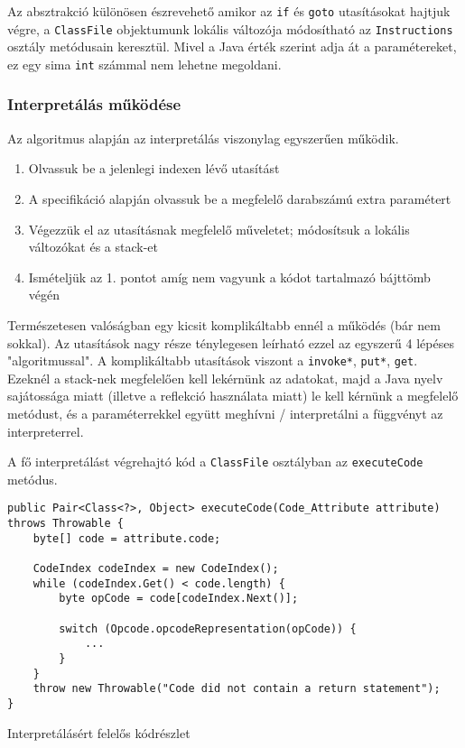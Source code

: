Az absztrakció különösen észrevehető amikor az \lstinline{if} és \lstinline{goto} utasításokat hajtjuk végre, a \lstinline{ClassFile} objektumunk lokális változója módosítható az \lstinline{Instructions} osztály metódusain keresztül. Mivel a Java érték szerint adja át a paramétereket, ez egy sima \lstinline{int} számmal nem lehetne megoldani.

\subsubsection{Interpretálás működése}

Az algoritmus alapján az interpretálás viszonylag egyszerűen működik.
\begin{enumerate}
	\item Olvassuk be a jelenlegi indexen lévő utasítást
	\item A specifikáció alapján olvassuk be a megfelelő darabszámú extra paramétert
	\item Végezzük el az utasításnak megfelelő műveletet; módosítsuk a lokális változókat és a stack-et
	\item Ismételjük az 1. pontot amíg nem vagyunk a kódot tartalmazó bájttömb végén
\end{enumerate}

Természetesen valóságban egy kicsit komplikáltabb ennél a működés (bár nem sokkal). Az utasítások nagy része ténylegesen leírható ezzel az egyszerű 4 lépéses "algoritmussal". A komplikáltabb utasítások viszont a \lstinline{invoke*}, \lstinline{put*}, \lstinline{get}. Ezeknél a stack-nek megfelelően kell lekérnünk az adatokat, majd a Java nyelv sajátossága miatt (illetve a reflekció használata miatt) le kell kérnünk a megfelelő metódust, és a paraméterrekkel együtt meghívni / interpretálni a függvényt az interpreterrel.

A fő interpretálást végrehajtó kód a \lstinline{ClassFile} osztályban az \lstinline{executeCode} metódus.

\begin{listing}[H]
\begin{verbatim}
public Pair<Class<?>, Object> executeCode(Code_Attribute attribute) throws Throwable {
	byte[] code = attribute.code;

	CodeIndex codeIndex = new CodeIndex();
	while (codeIndex.Get() < code.length) {
		byte opCode = code[codeIndex.Next()];

		switch (Opcode.opcodeRepresentation(opCode)) {
			...
		}
	}
	throw new Throwable("Code did not contain a return statement");
}
\end{verbatim}
\caption{Interpretálásért felelős kódrészlet}
\end{listing}

